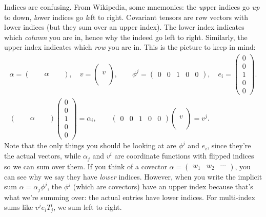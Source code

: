 \begin{note}
    Indices are confusing. From Wikipedia, some mnemonics: the \emph{up}per indices go \emph{up} to down, \emph{l}ower indices go \emph{l}eft to right. C\emph{o}variant tensors are r\emph{o}w vectors with l\emph{o}wer indices (but they sum over an upper index). The lower index indicates which \emph{column} you are in, hence why the indeed go left to right. Similarly, the upper index indicates which \emph{row} you are in. This is the picture to keep in mind:
\begin{gather*}
\alpha =
\begin{pmatrix}
    & & \alpha & &
\end{pmatrix},\quad v=
\begin{pmatrix}
    \\
    \\
    v\\
\\
\\
\end{pmatrix},\qquad \phi^j =
\begin{pmatrix}
    0 & 0 & 1 & 0 & 0
\end{pmatrix},\quad e_i =
\begin{pmatrix}
    0 \\ 0 \\ 1 \\ 0 \\ 0
\end{pmatrix}.\\
\begin{pmatrix}
    & & \alpha  & &
\end{pmatrix}
\begin{pmatrix}
    0 \\ 0 \\1\\0\\0
\end{pmatrix}=\alpha _i ,\qquad
\begin{pmatrix}
    0&0&1&0&0
\end{pmatrix}
\begin{pmatrix}
    \\ \\ v \\ \\ \\
\end{pmatrix}=v^j .
\end{gather*}
    Note that the only things you should be looking at are $\phi^j $ and $e_i $, since they're the actual vectors, while $\alpha _j $ and $v^i $ are coordinate functions with flipped indices so we can sum over them. If you think of a covector $\alpha =
    \begin{pmatrix}
        w_1 & w_2 & \cdots 
    \end{pmatrix}$, you can see why we say they have \emph{lower} indices. However, when you write the implicit sum $\alpha =\alpha _j \phi^j $, the $\phi^j $ (which are covectors) have an upper index because that's what we're summing over: the actual entries have lower indices. For multi-index sums like $v^j e_i T^i _j $, we sum left to right.
\end{note}
